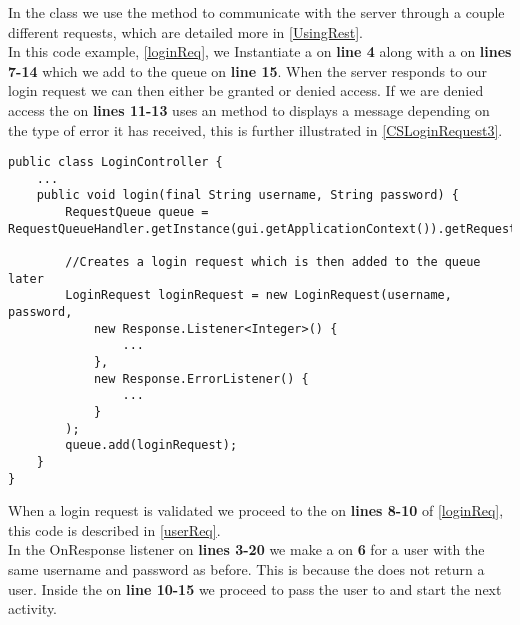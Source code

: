 In the  class we use the  method to
communicate with the server through a couple different requests, which are
detailed more in \autoref{UsingRest}.\\

In this code example, \autoref{loginReq}, we Instantiate a 
on \textbf{line 4} along with a  on \textbf{lines 7-14}
which we add to the queue on \textbf{line 15}. When the server responds to our
login request we can then either be granted or denied access. If we are denied
access the  on \textbf{lines 11-13} uses an
 method to displays a message depending on the type of
error it has received, this is further illustrated in
\autoref{CSLoginRequest3}.\nl

\begin{minipage}[H]{\linewidth}
\begin{lstlisting}[caption = Verifing the user information through a login
request, label = loginReq] 
public class LoginController {
	...
    public void login(final String username, String password) {
        RequestQueue queue = RequestQueueHandler.getInstance(gui.getApplicationContext()).getRequestQueue();

        //Creates a login request which is then added to the queue later
        LoginRequest loginRequest = new LoginRequest(username, password,
        	new Response.Listener<Integer>() {
        		...
        	},
        	new Response.ErrorListener() {
        		...
        	}
   		);
		queue.add(loginRequest);
	}
}
\end{lstlisting}
\end{minipage}

When a login request is validated we proceed to the  on
\textbf{lines 8-10} of \autoref{loginReq}, this code is described in
\autoref{userReq}.\\
In the OnResponse listener on \textbf{lines 3-20} we make a 
on \textbf{6} for a user with the same username and password as before. This is
because the  does not return a user. Inside the
 on \textbf{line 10-15} we proceed to pass the user
to  and start the next activity.\nl

